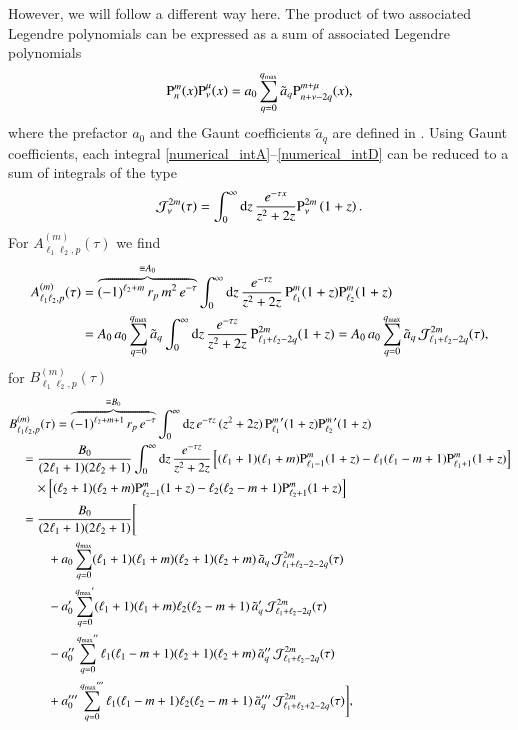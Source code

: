However, we will follow a different way here. The product of two associated
Legendre polynomials can be expressed as a sum of associated Legendre polynomials
\begin{equation}
{\text{P}_{n}^{m}}(x) {\text{P}_{\nu}^{\mu}}(x) = a_0 \sum_{q=0}^{q_\text{max}} \tilde a_q  {\text{P}_{n+\nu-2q}^{m+\mu}}(x),
\end{equation}
where the prefactor $a_0$ and the Gaunt coefficients $\tilde a_q$ are defined in \cite{Xu199753}. Using
Gaunt coefficients, each integral \eqref{numerical_intA}--\eqref{numerical_intD} can
be reduced to a sum of integrals of the type
\begin{equation}
\mathcal{J}_\nu^{2m}(\tau) = \int_0^\infty \mathrm{d}z \, \frac{e^{-\tau x}}{z^2+2z} {\text{P}_{\nu}^{2m}}\left(1+z\right).
\end{equation}
For $A_{\ell_1\ell_2,p}^{(m)}(\tau)$ we find
\begin{align}
\nonumber
A_{\ell_1\ell_2,p}^{(m)}(\tau) &= \overbrace{(-1)^{\ell_2+m} \, r_p \, m^2 \, e^{-\tau}}^{\equiv A_0} \int_0^\infty \mathrm{d}z \, \frac{e^{-\tau z}}{z^2+2z} \, {\text{P}_{\ell_1}^{m}}(1+z) {\text{P}_{\ell_2}^{m}}(1+z) \\
&= A_0 \, a_0 \sum_{q=0}^{q_\text{max}} \tilde a_q \int_0^\infty \mathrm{d}z \, \frac{e^{-\tau z}}{z^2+2z} \, {\text{P}_{\ell_1+\ell_2-2q}^{2m}}(1+z) = A_0 \, a_0 \sum_{q=0}^{q_\text{max}} \tilde a_q \, \mathcal{J}_{\ell_1+\ell_2-2q}^{2m}(\tau),
\end{align}
for $B_{\ell_1\ell_2,p}^{(m)}(\tau)$
\begin{align}
\nonumber
&B_{\ell_1\ell_2,p}^{(m)}(\tau) = \overbrace{(-1)^{\ell_2+m+1} \, r_p \, e^{-\tau}}^{\equiv B_0} \int_0^\infty \mathrm{d}z \, e^{-\tau z} \, (z^2+2z) \, {\text{P}_{\ell_1}^{m}}^\prime(1+z) {\text{P}_{\ell_2}^{m}}^\prime(1+z) \\
\nonumber
&\quad = \frac{B_0}{(2\ell_1+1)(2\ell_2+1)} \int_0^\infty \mathrm{d}z \, \frac{e^{-\tau z}}{z^2+2z} \left[ (\ell_1+1)(\ell_1+m){\text{P}_{\ell_1-1}^{m}}(1+z) - \ell_1(\ell_1-m+1){\text{P}_{\ell_1+1}^{m}}(1+z) \right] \\
\nonumber
& \quad\quad \times \left[ (\ell_2+1)(\ell_2+m){\text{P}_{\ell_2-1}^{m}}(1+z) - \ell_2(\ell_2-m+1){\text{P}_{\ell_2+1}^{m}}(1+z) \right] \\
\nonumber
&\quad = \frac{B_0}{(2\ell_1+1)(2\ell_2+1)} \Bigg[ \\
\nonumber
   &\quad\quad\quad +a_0                      \sum_{q=0}^{q_\text{max}}                        (\ell_1+1)(\ell_1+m)(\ell_2+1)(\ell_2+m) \, \tilde a_q \, \mathcal{J}_{\ell_1+\ell_2-2-2q}^{2m}(\tau) \\
\nonumber
   &\quad\quad\quad -a_0^\prime               \sum_{q=0}^{{q_\text{max}}^\prime}               (\ell_1+1)(\ell_1+m)\ell_2(\ell_2-m+1)   \, \tilde a_q^\prime \, \mathcal{J}_{\ell_1+\ell_2-2q}^{2m}(\tau) \\
\nonumber
   &\quad\quad\quad -a_0^{\prime\prime}       \sum_{q=0}^{{q_\text{max}}^{\prime\prime}}       \ell_1(\ell_1-m+1)(\ell_2+1)(\ell_2+m)   \, \tilde a_q^{\prime\prime} \, \mathcal{J}_{\ell_1+\ell_2-2q}^{2m}(\tau) \\
   &\quad\quad\quad +a_0^{\prime\prime\prime} \sum_{q=0}^{{q_\text{max}}^{\prime\prime\prime}} \ell_1(\ell_1-m+1)\ell_2(\ell_2-m+1)     \, \tilde a_q^{\prime\prime\prime} \, \mathcal{J}_{\ell_1+\ell_2+2-2q}^{2m}(\tau) \Bigg],
\end{align}
